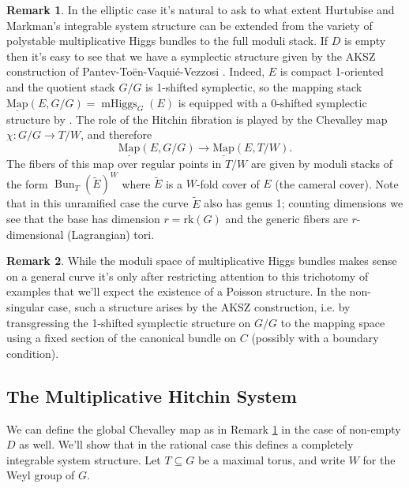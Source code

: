 \documentclass[11pt, oneside, reqno]{amsart}
\theoremstyle{definition} \newtheorem{definition}{Definition}[section]
\theoremstyle{definition} \newtheorem{remark}[definition]{Remark}
\theoremstyle{definition} \newtheorem{remarks}[definition]{Remarks}
\theoremstyle{definition} \newtheorem{question}[definition]{Question}
\theoremstyle{definition} \newtheorem*{note}{Note}
\theoremstyle{definition} \newtheorem{example}[definition]{Example}
\theoremstyle{definition} \newtheorem{examples}[definition]{Examples}
\newcommand{\mr}[1]{\mathrm{#1}}
\newcommand{\wt}[1]{\widetilde{#1}}
\newcommand{\ul}[1]{\underline{#1}}
\newcommand{\sub}{\subseteq}
\DeclareMathOperator{\bun}{Bun}
\DeclareMathOperator{\mhiggs}{mHiggs}
\newcommand{\map}{\ul{\mr{Map}}}
\begin{document}
\begin{remark} \label{Elliptic_AKSZ_remark}
In the elliptic case it's natural to ask to what extent Hurtubise and Markman's integrable system structure can be extended from the variety of polystable multiplicative Higgs bundles to the full moduli stack.  If $D$ is empty then it's easy to see that we have a symplectic structure given by the AKSZ construction of Pantev-To\"en-Vaqui\'e-Vezzosi \cite{PTVV}.  Indeed, $E$ is compact 1-oriented and the quotient stack $G/G$ is 1-shifted symplectic, so the mapping stack $\map(E, G/G) = \mhiggs_G(E)$ is equipped with a 0-shifted symplectic structure by \cite[Theorem 2.5]{PTVV}.  The role of the Hitchin fibration is played by the Chevalley map $\chi \colon G/G \to T/W$, and therefore
\[\map(E,G/G) \to \map(E,T/W).\]
The fibers of this map over regular points in $T/W$ are given by moduli stacks of the form $\bun_T(\wt E)^W$ where $\wt E$ is a $W$-fold cover of $E$ (the cameral cover).  Note that in this unramified case the curve $\wt E$ also has genus 1; counting dimensions we see that the base has dimension $r = \mr{rk}(G)$ and the generic fibers are $r$-dimensional (Lagrangian) tori.
\end{remark}

\begin{remark}
While the moduli space of multiplicative Higgs bundles makes sense on a general curve it's only after restricting attention to this trichotomy of examples that we'll expect the existence of a Poisson structure.  In the non-singular case, such a structure arises by the AKSZ construction, i.e. by transgressing the 1-shifted symplectic structure on $G/G$ to the mapping space using a fixed section of the canonical bundle on $C$ (possibly with a boundary condition).  
\end{remark}

\subsection{The Multiplicative Hitchin System} \label{Hitchin_system_section}
We can define the global Chevalley map as in Remark \ref{Elliptic_AKSZ_remark} in the case of non-empty $D$ as well.  We'll show that in the rational case this defines a completely integrable system structure.  Let $T \sub G$ be a maximal torus, and write $W$ for the Weyl group of $G$.
\end{document}
